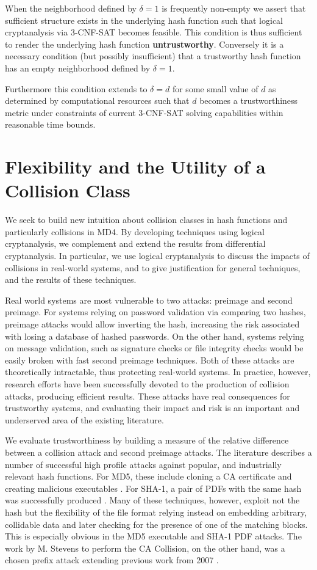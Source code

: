 \documentclass[conference]{IEEEtran}
\begin{document}
When the neighborhood defined by $\delta = 1$ is frequently non-empty
we assert that sufficient structure exists in the underlying hash
function such that logical cryptanalysis via 3-CNF-SAT becomes
feasible.  This condition is thus sufficient to render the underlying
hash function \textbf{untrustworthy}.  Conversely it is a necessary
condition (but possibly insufficient) that a trustworthy hash function
has an empty neighborhood defined by $\delta = 1$.

Furthermore this condition extends to $\delta = d$ for some small
value of $d$ as determined by computational resources such that $d$
becomes a trustworthiness metric under constraints of current
3-CNF-SAT solving capabilities within reasonable time bounds.

\section{Flexibility and the Utility of a Collision Class} \label{Sec:Intuition}

We seek to build new intuition about collision classes in hash functions
and particularly collisions in MD4. By developing techniques using logical
cryptanalysis, we complement and extend the results from
differential cryptanalysis. In particular, we use logical cryptanalysis
to discuss the impacts of collisions in real-world systems, and to
give justification for general techniques, and the
results of these techniques.

Real world systems are most vulnerable to two attacks: preimage
and second preimage. For systems relying on password validation via
comparing two hashes, preimage attacks would allow inverting the hash,
increasing the risk associated with losing a database of hashed passwords.
On the other hand, systems relying on message validation, such as signature
checks or file integrity checks would be easily broken with fast second
preimage techniques. Both of these attacks are theoretically intractable, thus protecting
real-world systems. In practice, however, research efforts have been
successfully devoted to the production of collision attacks, producing
efficient results.  These attacks have real consequences for
trustworthy systems, and evaluating their impact and risk is an
important and underserved area of the existing literature.

We evaluate trustworthiness by building a measure of the relative difference between a collision
attack and second preimage attacks. The literature describes a number
of successful high profile attacks against popular, and industrially
relevant hash functions.
For MD5, these include cloning a CA certificate \cite{Stevens2009}
and creating malicious executables \cite{MD5Executables}. For SHA-1, a pair of
PDFs with the same hash was successfully produced \cite{cryptoeprint:2017:190}. Many of these
techniques, however, exploit not the hash but the flexibility of the file format
relying instead on embedding arbitrary, collidable data and later checking for
the presence of one of the matching blocks. This is especially obvious in the
MD5 executable and SHA-1 PDF attacks. The work by M. Stevens to perform the
CA Collision, on the other hand, was a chosen prefix attack extending
previous work from 2007 \cite{Stevens2007}.
\end{document}
